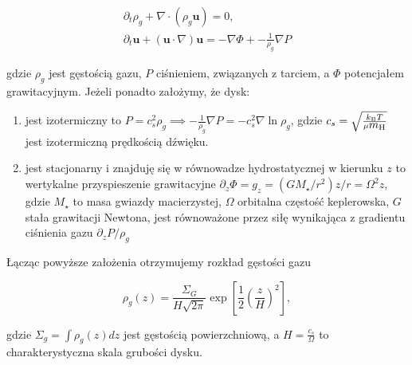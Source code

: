\begin{gather}
   \partial_t \rho_g + \nabla\cdot\left(\rho_g\mathbf{u}\right) = 0,
   \label{eq:hd1}\\
\partial_t \mathbf{u} + \left(\mathbf{u}\cdot\nabla\right)\mathbf{u} = 
-\nabla\Phi + -\frac{1}{\rho_g} \nabla P \label{eq:hd2}
\end{gather}

gdzie $\rho_g$ jest gęstością gazu, $P$ ciśnieniem, 
związanych z tarciem, a $\Phi$ potencjałem grawitacyjnym. Jeżeli ponadto
założymy, że dysk:

\begin{enumerate}
   \item jest izotermiczny to $P = c_s^2 \rho_g \implies -\frac{1}{\rho_g}\nabla
      P = -c_s^2\nabla\ln\rho_g$, gdzie $c_s = \sqrt{\frac{k_{\textrm{B}} T}{\mu
    \hbox{$m_{\textrm{H}}$}}}$ jest izotermiczną prędkością dźwięku.
   \item jest stacjonarny i znajduję się w równowadze hydrostatycznej w kierunku
      $z$ to wertykalne przyspieszenie grawitacyjne $\partial_z \Phi = g_z =
      (GM_\star/r^2) z/r = \Omega^2 z$, gdzie $M_\star$ to masa gwiazdy
      macierzystej, $\Omega$ orbitalna częstość keplerowska, $G$ stała
      grawitacji Newtona, jest równoważone przez siłę wynikająca z gradientu
      ciśnienia gazu $\partial_z P / \rho_g$
\end{enumerate}

Łącząc powyższe założenia otrzymujemy rozkład gęstości gazu

\begin{equation} \label{eq:zeq}
   \rho_g(z) = \frac{\Sigma_G}{H\sqrt{2\pi}} \exp \left[
   \frac{1}{2}\left(\frac{z}{H}\right)^2 \right],
\end{equation}

gdzie $\Sigma_g = \int \rho_g(z) dz$ jest gęstością powierzchniową, a
$H=\frac{c_s}{\Omega}$ to charakterystyczna skala grubości dysku.

